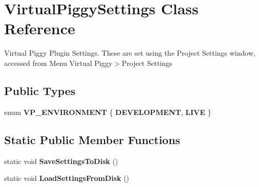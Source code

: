 \hypertarget{class_virtual_piggy_settings}{\section{Virtual\-Piggy\-Settings Class Reference}
\label{class_virtual_piggy_settings}
}


Virtual Piggy Plugin Settings. These are set using the Project Settings window, accessed from Menu Virtual Piggy$>$Project Settings  


\subsection*{Public Types}
\begin{DoxyCompactItemize}
\item 
enum {\bfseries V\-P\-\_\-\-E\-N\-V\-I\-R\-O\-N\-M\-E\-N\-T} \{ {\bfseries D\-E\-V\-E\-L\-O\-P\-M\-E\-N\-T}, 
{\bfseries L\-I\-V\-E}
 \}
\end{DoxyCompactItemize}
\subsection*{Static Public Member Functions}
\begin{DoxyCompactItemize}
\item 
\hypertarget{class_virtual_piggy_settings_a05e4d1aa8d82b9e6f2aba9bff0ab201f}{static void {\bfseries Save\-Settings\-To\-Disk} ()}\label{class_virtual_piggy_settings_a05e4d1aa8d82b9e6f2aba9bff0ab201f}

\item 
\hypertarget{class_virtual_piggy_settings_ab019ab2036fb553ee8db1dfe2d68ac85}{static void {\bfseries Load\-Settings\-From\-Disk} ()}\label{class_virtual_piggy_settings_ab019ab2036fb553ee8db1dfe2d68ac85}

\end{DoxyCompactItemize}
